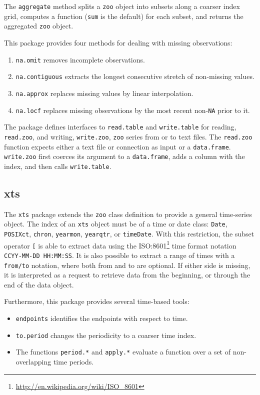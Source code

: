The \texttt{aggregate} method splits a \texttt{zoo} object into
subsets along a coarser index grid, computes a function (\texttt{sum}
is the default) for each subset, and returns the aggregated
\texttt{zoo} object.

This package provides four methods for dealing with missing
observations:
\begin{enumerate}
\item \texttt{na.omit} removes incomplete observations.
\item \texttt{na.contiguous} extracts the longest consecutive stretch
  of non-missing values.
\item \texttt{na.approx} replaces missing values by linear
  interpolation.
\item \texttt{na.locf} replaces missing observations by the most
  recent non-\texttt{NA} prior to it.
\end{enumerate}

The package defines interfaces to \texttt{read.table} and
\texttt{write.table} for reading, \texttt{read.zoo}, and writing,
\texttt{write.zoo}, \texttt{zoo} series from or to text files.  The
\texttt{read.zoo} function expects either a text file or connection as
input or a \texttt{data.frame}. \texttt{write.zoo} first coerces its
argument to a \texttt{data.frame}, adds a column with the index, and
then calls \texttt{write.table}.


\subsection{xts}
\label{sec:xts}


The \texttt{xts} package \cite{Ryan.Ulrich2013} extends the
\texttt{zoo} class definition to provide a general time-series
object. The index of an \texttt{xts} object must be of a time or date
class: \texttt{Date}, \texttt{POSIXct}, \texttt{chron},
\texttt{yearmon}, \texttt{yearqtr}, or \texttt{timeDate}. With this
restriction, the subset operator \texttt{[} is able to extract data
using the
ISO:8601\footnote{\url{http://en.wikipedia.org/wiki/ISO_8601}} time
format notation \texttt{CCYY-MM-DD HH:MM:SS}. It is also possible to
extract a range of times with a \texttt{from/to} notation, where both
from and to are optional. If either side is missing, it is
interpreted as a request to retrieve data from the beginning, or
through the end of the data object.

Furthermore, this package provides several time-based tools:
\begin{itemize}
\item \texttt{endpoints} identifies the endpoints with respect to
  time.
\item \texttt{to.period} changes the periodicity to a coarser time
  index.
\item The functions \lstinline{period.*} and \lstinline{apply.*}
  evaluate a function over a set of non-overlapping time periods.
\end{itemize}



